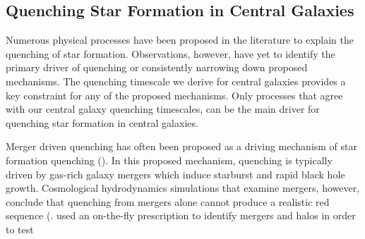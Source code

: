 \documentclass[iop,apj,tighten,twocolappendix,numberedappendix]{emulateapj}
\newcommand{\todo}[1]{{\bf \textcolor{red}{ #1}}}
\begin{document}
\subsection{Quenching Star Formation in Central Galaxies}  
Numerous physical processes have been proposed in the literature to explain
the quenching of star formation. Observations, however, have yet to identify 
the primary driver of quenching or consistently narrowing down proposed
mechanisms. The quenching timescale we derive for central galaxies provides 
a key constraint for any of the proposed mechanisms. Only processes that agree 
with our central galaxy quenching timescales, can be the main driver for quenching 
star formation in central galaxies. 

Merger driven quenching has often been proposed as a driving mechanism 
of star formation quenching (\citealt{Springel:2005aa, Hopkins:2006ab, 
Hopkins:2008ab, Hopkins:2008aa}). In this proposed mechanism, quenching
is typically driven by gas-rich galaxy mergers which induce starburst and rapid 
black hole growth. 
Cosmological hydrodynamics simulations that examine mergers, however, 
conclude that quenching from mergers alone cannot 
produce a realistic red sequence (\citealt{Gabor:2010aa, Gabor:2011aa}.
\cite{Gabor:2011aa} used an on-the-fly 
prescription to identify mergers and halos in order to test
\end{document}

